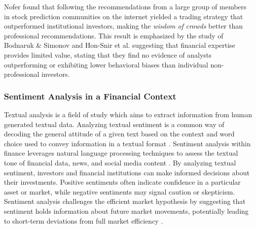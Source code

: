 Nofer \parencite*{nofer2015crowds} found that following the recommendations from a large group of members in stock prediction communities on the internet yielded a trading strategy that outperformed institutional investors, making the \textit{wisdom of crowds} better than professional recommendations. This result is emphasized by the study of Bodnaruk \& Simonov \parencite*{bodnaruk2015financial} and Hon-Snir et al. \parencite*{hon2012stock} suggesting that financial expertise provides limited value, stating that they find no evidence of analysts outperforming or exhibiting lower behavioral biases than individual non-professional investors. 


\subsubsection{Sentiment Analysis in a Financial Context}





Textual analysis is a field of study which aims to extract information from human generated textual data. Analyzing textual sentiment is a common way of decoding the general attitude of a given text based on the context and word choice used to convey information in a textual format \parencite{pang2008opinion}. Sentiment analysis within finance leverages natural language processing techniques to assess the textual tone of financial data, news, and social media content \parencite{towardsdatascienceEvolvedFinancial}. By analyzing textual sentiment, investors and financial institutions can make informed decisions about their investments. Positive sentiments often indicate confidence in a particular asset or market, while negative sentiments may signal caution or skepticism. Sentiment analysis challenges the efficient market hypothesis by suggesting that sentiment holds information about future market movements, potentially leading to short-term deviations from full market efficiency \parencite{chowdhury2014news}. 

